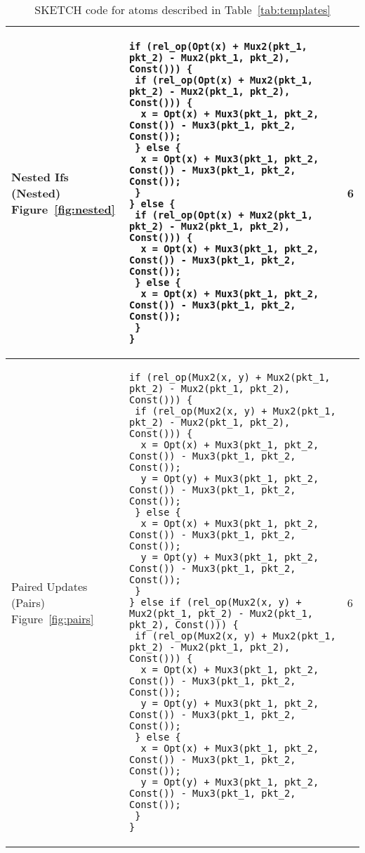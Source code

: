 \begin{table*}[!htbp]
\begin{scriptsize}
\begin{tabular}{|p{}|p{}|p{}|}
\hline
\pbox{0.1\textwidth}
{Nested Ifs (Nested)\\Figure~\ref{fig:nested}} &
{\begin{lstlisting}[style=customctable]
if (rel_op(Opt(x) + Mux2(pkt_1, pkt_2) - Mux2(pkt_1, pkt_2), Const())) {
 if (rel_op(Opt(x) + Mux2(pkt_1, pkt_2) - Mux2(pkt_1, pkt_2), Const())) {
  x = Opt(x) + Mux3(pkt_1, pkt_2, Const()) - Mux3(pkt_1, pkt_2, Const());
 } else {
  x = Opt(x) + Mux3(pkt_1, pkt_2, Const()) - Mux3(pkt_1, pkt_2, Const());
 }
} else {
 if (rel_op(Opt(x) + Mux2(pkt_1, pkt_2) - Mux2(pkt_1, pkt_2), Const())) {
  x = Opt(x) + Mux3(pkt_1, pkt_2, Const()) - Mux3(pkt_1, pkt_2, Const());
 } else {
  x = Opt(x) + Mux3(pkt_1, pkt_2, Const()) - Mux3(pkt_1, pkt_2, Const());
 }
}
\end{lstlisting}} &
6 \\

\hline
\pbox{0.1\textwidth}
{Paired Updates (Pairs)\\Figure~\ref{fig:pairs}} &
{\begin{lstlisting}[style=customctable]
if (rel_op(Mux2(x, y) + Mux2(pkt_1, pkt_2) - Mux2(pkt_1, pkt_2), Const())) {
 if (rel_op(Mux2(x, y) + Mux2(pkt_1, pkt_2) - Mux2(pkt_1, pkt_2), Const())) {
  x = Opt(x) + Mux3(pkt_1, pkt_2, Const()) - Mux3(pkt_1, pkt_2, Const());
  y = Opt(y) + Mux3(pkt_1, pkt_2, Const()) - Mux3(pkt_1, pkt_2, Const());
 } else {
  x = Opt(x) + Mux3(pkt_1, pkt_2, Const()) - Mux3(pkt_1, pkt_2, Const());
  y = Opt(y) + Mux3(pkt_1, pkt_2, Const()) - Mux3(pkt_1, pkt_2, Const());
 }
} else if (rel_op(Mux2(x, y) + Mux2(pkt_1, pkt_2) - Mux2(pkt_1, pkt_2), Const())) {
 if (rel_op(Mux2(x, y) + Mux2(pkt_1, pkt_2) - Mux2(pkt_1, pkt_2), Const())) {
  x = Opt(x) + Mux3(pkt_1, pkt_2, Const()) - Mux3(pkt_1, pkt_2, Const());
  y = Opt(y) + Mux3(pkt_1, pkt_2, Const()) - Mux3(pkt_1, pkt_2, Const());
 } else {
  x = Opt(x) + Mux3(pkt_1, pkt_2, Const()) - Mux3(pkt_1, pkt_2, Const());
  y = Opt(y) + Mux3(pkt_1, pkt_2, Const()) - Mux3(pkt_1, pkt_2, Const());
 }
}
\end{lstlisting}} &
6 \\
\hline

  \end{tabular}
  \end{scriptsize}
  \caption{SKETCH code for atoms described in Table~\ref{tab:templates}}
  \label{tab:atom_code}
\end{table*}
